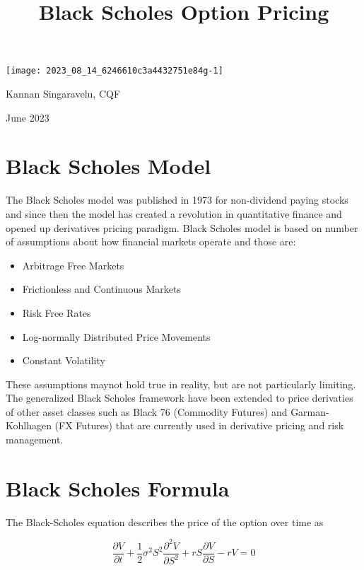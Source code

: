 \documentclass[10pt]{article}
\title{Black Scholes Option Pricing }
\author{}
\date{}
\begin{document}
\maketitle
\begin{center}
\texttt{[image: 2023\_08\_14\_6246610c3a4432751e84g-1]}
\end{center}

Kannan Singaravelu, CQF

June 2023

\section*{Black Scholes Model}
The Black Scholes model was published in 1973 for non-dividend paying stocks and since then the model has created a revolution in quantitative finance and opened up derivatives pricing paradigm. Black Scholes model is based on number of assumptions about how financial markets operate and those are:

\begin{itemize}
  \item Arbitrage Free Markets

  \item Frictionless and Continuous Markets

  \item Risk Free Rates

  \item Log-normally Distributed Price Movements

  \item Constant Volatility

\end{itemize}

These assumptions maynot hold true in reality, but are not particularly limiting. The generalized Black Scholes framework have been extended to price derivaties of other asset classes such as Black 76 (Commodity Futures) and Garman-Kohlhagen (FX Futures) that are currently used in derivative pricing and risk management.

\section*{Black Scholes Formula}
The Black-Scholes equation describes the price of the option over time as

$$
\frac{\partial V}{\partial t}+\frac{1}{2} \sigma^{2} S^{2} \frac{\partial^{2} V}{\partial S^{2}}+r S \frac{\partial V}{\partial S}-r V=0
$$
\end{document}
